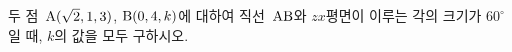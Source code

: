 두 점~$\mathrm{A}(\sqrt{2}{,}\mkern3mu\mathopen{}1{,}\mkern3mu\mathopen{}3)$, $\mathrm{B}(0{,}\mkern3mu\mathopen{}4{,}\mkern3mu\mathopen{}k)$에 대하여 직선~$\mathrm{AB}$와 $zx$평면이 이루는 각의 크기가 $60^\circ$일 때, $k$의 값을 모두 구하시오.
